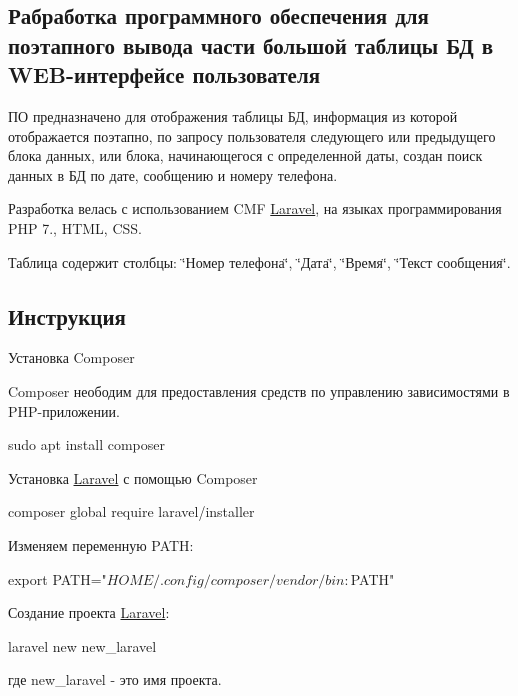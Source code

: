 \subsection*{Рабработка программного обеспечения для поэтапного вывода части большой таблицы БД в W\+E\+B-\/интерфейсе пользователя}

ПО предназначено для отображения таблицы БД, информация из которой отображается поэтапно, по запросу пользователя следующего или предыдущего блока данных, или блока, начинающегося с определенной даты, создан поиск данных в БД по дате, сообщению и номеру телефона.

Разработка велась с использованием C\+MF \hyperlink{namespaceLaravel}{Laravel}, на языках программирования P\+HP 7., H\+T\+ML, C\+SS.

Таблица содержит столбцы\+: \char`\"{}Номер телефона\char`\"{}, \char`\"{}Дата\char`\"{}, \char`\"{}Время\char`\"{}, \char`\"{}Текст сообщения\char`\"{}.

\subsection*{Инструкция}


\begin{DoxyItemize}
\item Установка Composer
\end{DoxyItemize}

Composer неободим для предоставления средств по управлению зависимостями в P\+H\+P-\/приложении. \begin{DoxyVerb}sudo apt install composer
\end{DoxyVerb}



\begin{DoxyItemize}
\item Установка \hyperlink{namespaceLaravel}{Laravel} с помощью Composer
\end{DoxyItemize}


\begin{DoxyCode}
composer global require laravel/installer
\end{DoxyCode}


Изменяем переменную P\+A\+TH\+: \begin{DoxyVerb}export PATH="$HOME/.config/composer/vendor/bin:$PATH"
\end{DoxyVerb}



\begin{DoxyItemize}
\item Создание проекта \hyperlink{namespaceLaravel}{Laravel}\+: 
\begin{DoxyCode}
laravel new new\_laravel
\end{DoxyCode}
 где new\+\_\+laravel -\/ это имя проекта.
\end{DoxyItemize}

